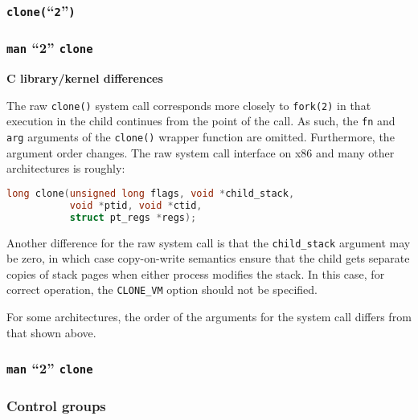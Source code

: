 \begin{frame}[fragile]

\frametitle{\texttt{clone(}``\texttt{2}''\texttt{)}}

\footnotesize



\end{frame}



% 
% 
% 
% 

\begin{frame}[fragile]

\frametitle{\texttt{man} ``2'' \texttt{clone}}

\footnotesize

\begin{manblock}

\textbf{C library/kernel differences}

\medskip

The raw \texttt{clone()} system call corresponds more closely to
\texttt{fork(2)} in that execution  in the  child continues from the point of
the call.  As such, the \texttt{fn} and \texttt{arg} arguments of the
\texttt{clone()} wrapper function are omitted.  Furthermore, the  argument
order  changes.  The raw system call interface on x86 and many other
architectures is roughly:

\begin{lstlisting}[language=c]
long clone(unsigned long flags, void *child_stack,
           void *ptid, void *ctid,
           struct pt_regs *regs);
\end{lstlisting}

Another  difference  for  the  raw system call is that the
\texttt{child\_stack} argument may be zero, in which case copy-on-write
semantics ensure that the child gets separate copies of  stack  pages  when
either  process modifies the stack.  In this case, for correct operation, the
\texttt{CLONE\_VM} option should not be specified.

\medskip

For some architectures, the order of the arguments for the system  call differs
from that  shown  above.

\end{manblock}

\end{frame}

\begin{frame}

\frametitle{\texttt{man} ``2'' \texttt{clone}}

\end{frame}

\begin{frame}

\frametitle{Control groups}

\end{frame}

